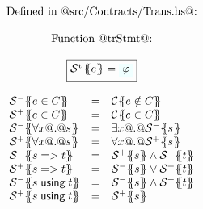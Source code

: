 \newcommand{\trc}[1]{{\cal C}\{\!\!\{#1\}\!\!\}}
\newcommand{\trcl}[1]{{\cal C}\{\!\!\{#1}
\newcommand{\trcr}[1]{#1\}\!\!\}}
\newcommand{\trs}[2]{{\cal S}^{#1}\{\!\!\{#2\}\!\!\}}

\begin{figure}\small
\setlength{\arraycolsep}{2pt}
\[\begin{array}{c}
\mbox{Defined in @src/Contracts/Trans.hs@:} \\ \\
\mbox{Function @trStmt@:} \\ \\
\ruleform{\trs{v}{e} = \formula{\phi}} \\ \\
\begin{array}{lcl}
  \trs{-}{e \in C}         & = & \trc{e \notin C} \\
  \trs{+}{e \in C}         & = & \trc{e \in C} \\
  \trs{-}{\forall x @.@ s} & = & \exists x @.@ \trs{-}{s} \\
  \trs{+}{\forall x @.@ s} & = & \forall x @.@ \trs{+}{s} \\
  \trs{-}{s => t}          & = & \trs{+}{s} \land \trs{-}{t} \\
  \trs{+}{s => t}          & = & \trs{-}{s} \lor \trs{+}{t} \\
  \trs{-}{s \; \textsf{using} \; t} & = & \trs{-}{s} \land \trs{+}{t} \\
  \trs{+}{s \; \textsf{using} \; t} & = & \trs{+}{s} \\
\end{array} \\ \\


\end{array}\]
\end{figure}
